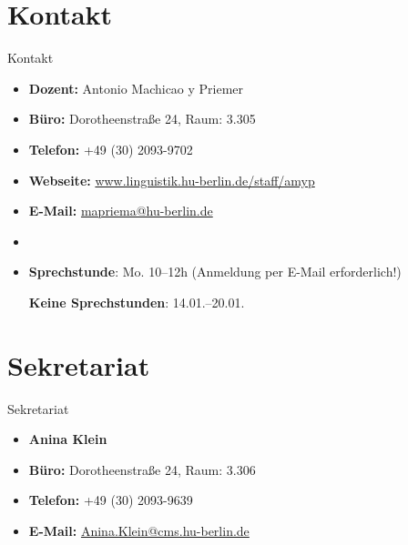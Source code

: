 \section{Kontakt}
%

\begin{frame}{Kontakt}

\begin{itemize}
	\item \textbf{Dozent:} Antonio Machicao y Priemer \textipa{[ma.\t{tS}i."ka.o."Pi."pKi:.m5]}
	\item \textbf{Büro:} Dorotheenstraße 24, Raum: 3.305
	\item \textbf{Telefon:} +49 (30) 2093-9702
	\item \textbf{Webseite:} \href{www.linguistik.hu-berlin.de/staff/amyp}{www.linguistik.hu-berlin.de/staff/amyp}
	\item \textbf{E-Mail:} \href{mailto:mapriema@hu-berlin.de}{mapriema@hu-berlin.de}
	\item[]
	\item \textbf{Sprechstunde}: Mo. 10--12h (Anmeldung per E-Mail erforderlich!)
	
	\textbf{Keine Sprechstunden}: 14.01.--20.01.
\end{itemize}	


\end{frame}


\section{Sekretariat}

\begin{frame}{Sekretariat}

\begin{itemize}
	\item[] \textbf{Anina Klein}	
	\item \textbf{Büro:} Dorotheenstraße 24, Raum: 3.306
	\item \textbf{Telefon:} +49 (30) 2093-9639
	\item \textbf{E-Mail:} \href{mailto:Anina.Klein@cms.hu-berlin.de}{Anina.Klein@cms.hu-berlin.de}
\end{itemize}	

\end{frame}


